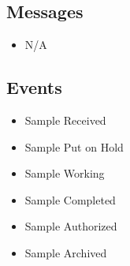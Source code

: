 \documentclass[11pt,twocolumn]{article}
\begin{document}
\subsection*{Messages}
\begin{itemize}
\item N/A
\end{itemize}

\subsection*{Events}
\begin{itemize}
\item Sample Received
\item Sample Put on Hold
\item Sample Working
\item Sample Completed
\item Sample Authorized
\item Sample Archived
\end{itemize}
\end{document}
